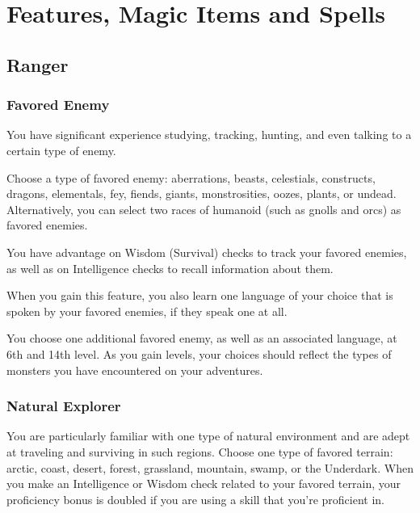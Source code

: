 \documentclass[letterpaper,openany,oneside,twocolumn]{book}
\begin{document}
\onecolumn


\rendercharactersheet

\renderbackgroundsheet

\renderspellsheet



\restoregeometry
\twocolumn

\chapter*{Features, Magic Items and Spells}

\section*{Ranger}
\subsection*{Favored Enemy}
You have significant experience studying, tracking, hunting, and even talking to a certain type of enemy.

Choose a type of favored enemy: aberrations, beasts, celestials, constructs, dragons, elementals, fey, fiends, giants, monstrosities, oozes, plants, or undead. Alternatively, you can select two races of humanoid (such as gnolls and orcs) as favored enemies.

You have advantage on Wisdom (Survival) checks to track your favored enemies, as well as on Intelligence checks to recall information about them.

When you gain this feature, you also learn one language of your choice that is spoken by your favored enemies, if they speak one at all.

You choose one additional favored enemy, as well as an associated language, at 6th and 14th level. As you gain levels, your choices should reflect the types of monsters you have encountered on your adventures.

\subsection*{Natural Explorer}
You are particularly familiar with one type of natural environment and are adept at traveling and surviving in such regions. Choose one type of favored terrain: arctic, coast, desert, forest, grassland, mountain, swamp, or the Underdark. When you make an Intelligence or Wisdom check related to your favored terrain, your proficiency bonus is doubled if you are using a skill that you're proficient in.
\end{document}
